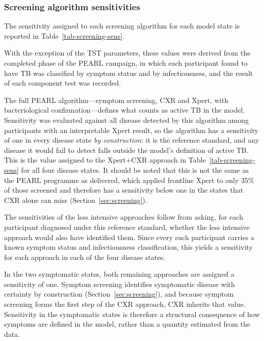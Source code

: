 \subsubsection{Screening algorithm sensitivities}

The sensitivity assigned to each screening algorithm for each model state is reported in Table~\ref{tab-screening-sens}. 



With the exception of the TST parameters, these values were derived from the completed phase of the PEARL campaign, in which each participant found to have TB was classified by symptom status and by infectiousness, and the result of each component test was recorded.

The full PEARL algorithm---symptom screening, CXR and Xpert, with bacteriological confirmation---defines what counts as active TB in the model. Sensitivity was evaluated against all disease detected by this algorithm among participants with an interpretable Xpert result, so the algorithm has a sensitivity of one in every disease state \emph{by construction}: it is the reference standard, and any disease it would fail to detect falls outside the model's definition of active TB. This is the value assigned to the Xpert+CXR approach in Table~\ref{tab-screening-sens} for all four disease states. It should be noted that this is not the same as the PEARL programme as delivered, which applied frontline Xpert to only 35\% of those screened and therefore has a sensitivity below one in the states that CXR alone can miss (Section~\ref{sec:screening}).

The sensitivities of the less intensive approaches follow from asking, for each participant diagnosed under this reference standard, whether the less intensive approach would also have identified them. Since every such participant carries a known symptom status and infectiousness classification, this yields a sensitivity for each approach in each of the four disease states.

In the two symptomatic states, both remaining approaches are assigned a sensitivity of one. Symptom screening identifies symptomatic disease with certainty by construction (Section~\ref{sec:screening}), and because symptom screening forms the first step of the CXR approach, CXR inherits that value. Sensitivity in the symptomatic states is therefore a structural consequence of how symptoms are defined in the model, rather than a quantity estimated from the data.

